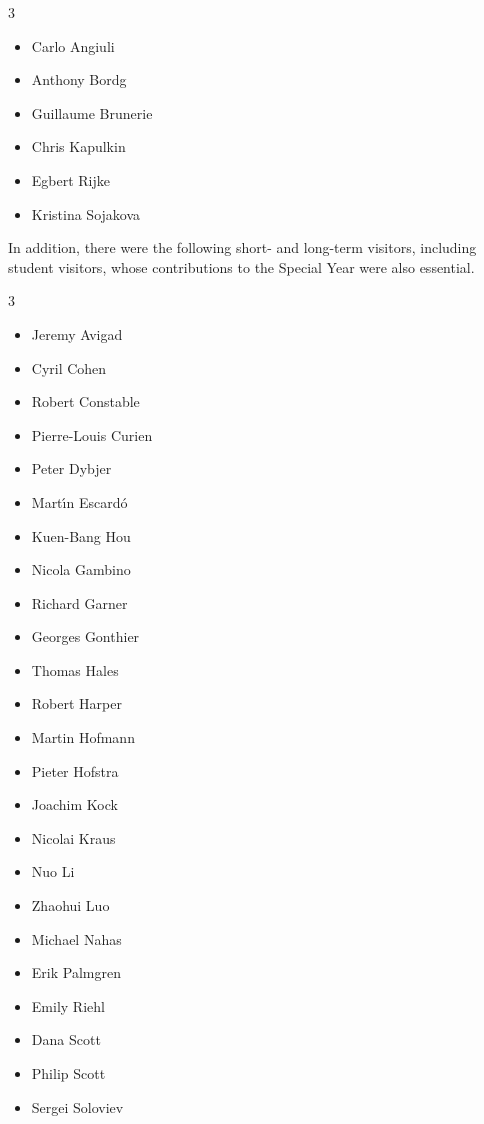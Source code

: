 \documentclass[12pt]{article}
\def\OPTprefacecols{3}
\begin{document}
\begin{multicols}{\OPTprefacecols}{
\begin{itemize}
\item[] Carlo Angiuli
\item[] Anthony Bordg
\item[] Guillaume Brunerie
\item[] Chris Kapulkin
\item[] Egbert Rijke
\item[] Kristina Sojakova
\end{itemize}
}
\end{multicols}

\noindent In addition, there were the following short- and long-term visitors, including student visitors, whose contributions to the Special Year were also essential.

\begin{multicols}{\OPTprefacecols}{
\begin{itemize}
\item[] Jeremy Avigad
\item[] Cyril Cohen
\item[] Robert Constable
\item[] Pierre-Louis Curien
\item[] Peter Dybjer
\item[] Mart{\'\i}n Escard{\'o}
\item[] Kuen-Bang Hou
\item[] Nicola Gambino
\item[] Richard Garner
\item[] Georges Gonthier
\item[] Thomas Hales
\item[] Robert Harper
\item[] Martin Hofmann
\item[] Pieter Hofstra
\item[] Joachim Kock
\item[] Nicolai Kraus
\item[] Nuo Li
\item[] Zhaohui Luo
\item[] Michael Nahas
\item[] Erik Palmgren
\item[] Emily Riehl
\item[] Dana Scott
\item[] Philip Scott
\item[] Sergei Soloviev
\end{itemize}
}
\end{multicols}
\end{document}
